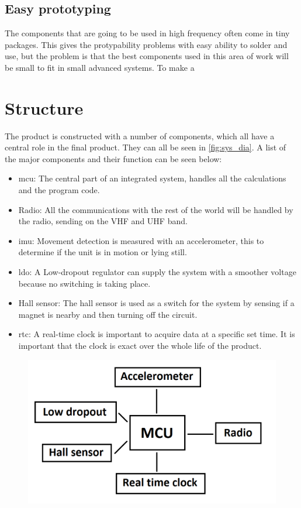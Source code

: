 \subsection{Easy prototyping}
The components that are going to be used in high frequency often come in tiny packages. This gives the protypability problems with easy ability to solder and use, but the problem is that the best components used in this area of work will be small to fit in small advanced systems. To make a

\section{Structure}
The product is constructed with a number of components, which all have a central role in the final product. They can all be seen in \autoref{fig:sys_dia}. A list of the major components and their function can be seen below:

\begin{itemize}[noitemsep] 
\item \gls{mcu}: The central part of an integrated system, handles all the calculations and the program code.
\item Radio: All the communications with the rest of the world will be handled by the radio, sending on the VHF and UHF band.
\item \gls{imu}: Movement detection is measured with an accelerometer, this to determine if the unit is in motion or lying still. 
\item \gls{ldo}: A Low-dropout regulator can supply the system with a smoother voltage because no switching is taking place.
\item Hall sensor: The hall sensor is used as a switch for the system by sensing if a magnet is nearby and then turning off the circuit.
\item \gls{rtc}: A real-time clock is important to acquire data at a specific set time. It is important that the clock is exact over the whole life of the product.
\end{itemize} 


\begin{figure}[H] 
	\centering 
	\includegraphics[width=.8\linewidth]{Figures/System_diagram} 
	\label{fig:sys_dia} 
\end{figure} 

